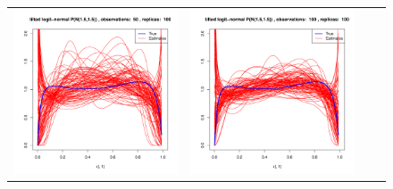\begin{figure}[h]
\begin{tabular}{cccc}
	
	\includegraphics[width=\textwidth/4]{../img/logitnormal/tilted/K3/densities/n50_R100.pdf}
	&
	\includegraphics[width=\textwidth/4]{../img/logitnormal/tilted/K3/densities/n100_R100.pdf}

\end{tabular}
\end{figure}

